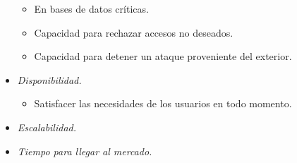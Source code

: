 \documentclass[a4paper,oneside,11pt]{book}
\begin{document}
\begin{itemize}
\begin{itemize}
					\item En bases de datos críticas.
					\item Capacidad para rechazar accesos no deseados.
					\item Capacidad para detener un ataque proveniente del exterior.
				\end{itemize}
			\item \textit{Disponibilidad.}
				\begin{itemize}
					\item Satisfacer las necesidades de los usuarios en todo momento.
				\end{itemize}
			\item \textit{Escalabilidad.}
			\item \textit{Tiempo para llegar al mercado.}
		\end{itemize}	
		
\end{document}
